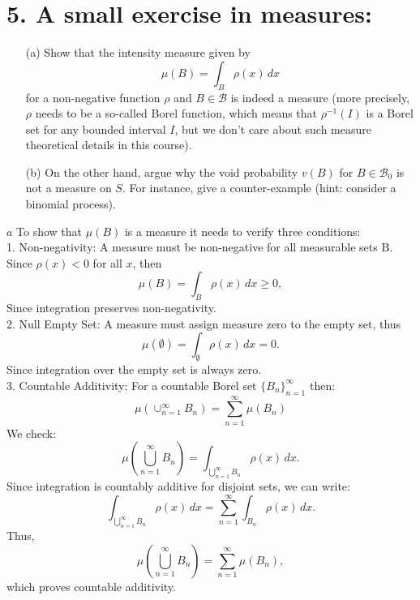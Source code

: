 \documentclass{article}
\begin{document}
\section*{5. A small exercise in measures:}
\begin{enumerate}
    \item[(a)] Show that the intensity measure given by
    \[
    \mu(B) = \int_B \rho(x) \, dx
    \]
    for a non-negative function $\rho$ and $B \in \mathcal{B}$ is indeed a measure (more precisely, $\rho$ needs to be a so-called Borel function, which means that $\rho^{-1}(I)$ is a Borel set for any bounded interval $I$, but we don’t care about such measure theoretical details in this course).
    
    \item[(b)] On the other hand, argue why the void probability $v(B)$ for $B \in \mathcal{B}_0$ is not a measure on $S$. For instance, give a counter-example (hint: consider a binomial process).
\end{enumerate}
\(a\) To show that $\mu(B)$ is a measure it needs to verify three conditions:\\
1. Non-negativity: A measure must be non-negative for all measurable sets $\mathrm{B}$.\\
Since $\rho(x)<0$ for all $x$, then
\[ 
    \mu(B) = \int_B \rho(x) \, dx \geq 0,
\]
Since integration preserves non-negativity.\\
2. Null Empty Set: A measure must assign measure zero to the empty set, thus\\
\[ 
    \mu(\emptyset) = \int_{\emptyset} \rho(x) \, dx=0.
\]
Since integration over the empty set is always zero.\\
3. Countable Additivity:
For a countable Borel set $\{B_n\}_{n=1}^{\infty}$ then:
\[
\mu\left(\cup^{\infty}_{n=1}B_n\right)= \sum_{n=1}^{\infty}\mu(B_n)
\]
We check:
\[
\mu \left( \bigcup_{n=1}^{\infty} B_n \right) = \int_{\bigcup_{n=1}^{\infty} B_n} \rho(x) \,dx.
\]
Since integration is countably additive for disjoint sets, we can write:
\[
\int_{\bigcup_{n=1}^{\infty} B_n} \rho(x) \,dx = \sum_{n=1}^{\infty} \int_{B_n} \rho(x) \,dx.
\]
Thus,
\[
\mu \left( \bigcup_{n=1}^{\infty} B_n \right) = \sum_{n=1}^{\infty} \mu(B_n),
\]
which proves countable additivity.
\end{document}
